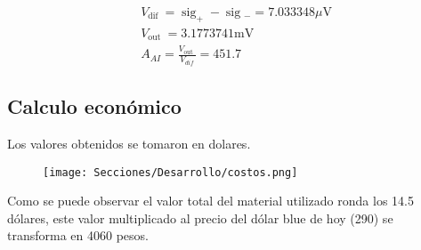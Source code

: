 \begin{equation*}
    \begin{aligned}
    &V_{\text {dif }}=\operatorname{sig}_{+}-\operatorname{sig}{ }_{-}=7.033348 \mu \mathrm{V}\\
    &V_{\text {out }}=3.1773741 \mathrm{mV}\\
    &A_{A I}=\frac{V_{\text {out }}}{V_{d i f}}=451.7
    \end{aligned}
\end{equation*}
\subsection{Calculo económico}
Los valores obtenidos se tomaron en dolares.
\begin{figure}[H]
    \centering
    \texttt{[image: Secciones/Desarrollo/costos.png]}
    \caption{}
    \label{fig:costos}
\end{figure}
Como se puede observar el valor total del material utilizado ronda los 14.5 dólares, este valor
multiplicado al precio del dólar blue de hoy (290) se transforma en 4060 pesos.
